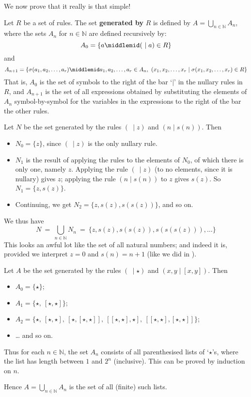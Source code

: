 We now prove that it really is that simple!

\begin{definition}
\label{defSetGeneratedByRules}
Let $R$ be a set of rules. The set \textbf{generated by} $R$ is defined by $A = \bigcup_{n \in \mathbb{N}} A_n$, where the sets $A_n$ for $n \in \mathbb{N}$ are defined recursively by:
\[ A_0 = \left\{ a \middlemid (~\mid a) \in R \right\} \]
and
\[ A_{n+1} = \left\{ \sigma(a_1,a_2,\dots,a_r) \middlemid a_1,a_2,\dots,a_r \in A_n, ~ (x_1,x_2,\dots,x_r \mid \sigma(x_1,x_2,\dots,x_r) \in R \right\} \]
That is, $A_0$ is the set of symbols to the right of the bar `$\mid$' in the nullary rules in $R$, and $A_{n+1}$ is the set of all expressions obtained by substituting the elements of $A_n$ symbol-by-symbol for the variables in the expressions to the right of the bar the other rules.
\end{definition}

\begin{example}
Let $N$ be the set generated by the rules $(~ \mid z)$ and $(n \mid s(n))$. Then
\begin{itemize}
\item $N_0 = \{ z \}$, since $(~ \mid z)$ is the only nullary rule.
\item $N_1$ is the result of applying the rules to the elements of $N_0$, of which there is only one, namely $z$. Applying the rule $(~\mid z)$ (to no elements, since it is nullary) gives $z$; applying the rule $(n \mid s(n))$ to $z$ gives $s(z)$. So $N_1 = \{ z, s(z) \}$.
\item Continuing, we get $N_2 = \{ z, s(z), s(s(z)) \}$, and so on.
\end{itemize}
We thus have
\[ N ~=~ \bigcup_{n \in \mathbb{N}} N_n ~=~ \{ z, s(z), s(s(z)), s(s(s(z))), \dots \} \]
This looks an awful lot like the set of all natural numbers; and indeed it is, provided we interpret $z=0$ and $s(n)=n+1$ (like we did in ).
\end{example}

\begin{example}
\label{exParenthesisations}
Let $A$ be the set generated by the rules $(~ \mid \star)$ and $(x,y \mid [x,y])$. Then
\begin{itemize}
\item $A_0 = \{ \star \}$;
\item $A_1 = \{ \star,~ [\star, \star] \}$;
\item $A_2 = \{ \star,~ [\star, \star],~ [\star, [\star,\star]],~ [[\star, \star], \star],~ [[\star,\star],[\star,\star]] \}$;
\item \dots{} and so on.
\end{itemize}
Thus for each $n \in \mathbb{N}$, the set $A_n$ consists of all parenthesised lists of `$\star$'s, where the list has length between $1$ and $2^n$ (inclusive). This can be proved by induction on $n$.

Hence $A = \bigcup_{n \in \mathbb{N}} A_n$ is the set of all (finite) such lists.
\end{example}

